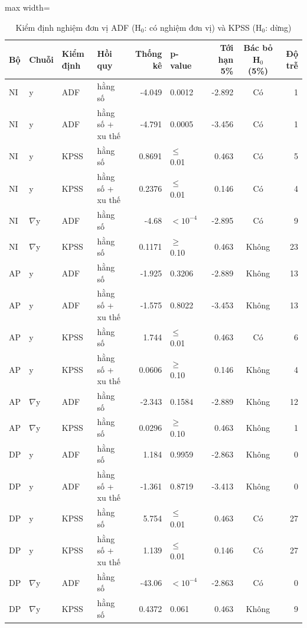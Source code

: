 \begin{table}[H]
\centering\scriptsize
\caption{Kiểm định nghiệm đơn vị ADF (H$_0$: có nghiệm đơn vị) và KPSS (H$_0$: dừng)}\label{tab:tab_b12_04_unit_root_tests}
\begin{adjustbox}{max width=\linewidth}
\begin{tabular}{|l|l|l|l|r|l|r|c|r|}
\toprule
Bộ & Chuỗi & Kiểm định & Hồi quy & Thống kê & p-value & Tới hạn 5\% & Bác bỏ H$_{0}$ (5\%) & Độ trễ \\
\midrule
NI & y & ADF & hằng số & -4.049 & 0.0012 & -2.892 & Có & 1 \\
NI & y & ADF & hằng số + xu thế & -4.791 & 0.0005 & -3.456 & Có & 1 \\
NI & y & KPSS & hằng số & 0.8691 & $\le$ 0.01 & 0.463 & Có & 5 \\
NI & y & KPSS & hằng số + xu thế & 0.2376 & $\le$ 0.01 & 0.146 & Có & 4 \\
NI & $\nabla$y & ADF & hằng số & -4.68 & $<10^{-4}$ & -2.895 & Có & 9 \\
NI & $\nabla$y & KPSS & hằng số & 0.1171 & $\ge$ 0.10 & 0.463 & Không & 23 \\
AP & y & ADF & hằng số & -1.925 & 0.3206 & -2.889 & Không & 13 \\
AP & y & ADF & hằng số + xu thế & -1.575 & 0.8022 & -3.453 & Không & 13 \\
AP & y & KPSS & hằng số & 1.744 & $\le$ 0.01 & 0.463 & Có & 6 \\
AP & y & KPSS & hằng số + xu thế & 0.0606 & $\ge$ 0.10 & 0.146 & Không & 4 \\
AP & $\nabla$y & ADF & hằng số & -2.343 & 0.1584 & -2.889 & Không & 12 \\
AP & $\nabla$y & KPSS & hằng số & 0.0296 & $\ge$ 0.10 & 0.463 & Không & 1 \\
DP & y & ADF & hằng số & 1.184 & 0.9959 & -2.863 & Không & 0 \\
DP & y & ADF & hằng số + xu thế & -1.361 & 0.8719 & -3.413 & Không & 0 \\
DP & y & KPSS & hằng số & 5.754 & $\le$ 0.01 & 0.463 & Có & 27 \\
DP & y & KPSS & hằng số + xu thế & 1.139 & $\le$ 0.01 & 0.146 & Có & 27 \\
DP & $\nabla$y & ADF & hằng số & -43.06 & $<10^{-4}$ & -2.863 & Có & 0 \\
DP & $\nabla$y & KPSS & hằng số & 0.4372 & 0.061 & 0.463 & Không & 9 \\
\bottomrule
\end{tabular}
\end{adjustbox}\par{}
\end{table}
